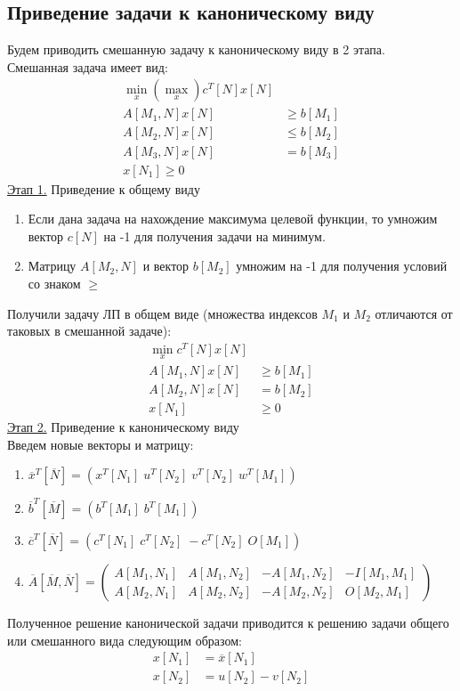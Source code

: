 \subsection{Приведение задачи к каноническому виду}
Будем приводить смешанную задачу к каноническому виду в 2 этапа. \\
Смешанная задача имеет вид:\\
\begin{align*} 
\min_x(\max_x) c^T[N]x[N] \\
A[M_1,N]x[N]&\geq b[M_1] \\
A[M_2,N]x[N]&\leq b[M_2] \\
A[M_3,N]x[N]&=b[M_3] \\
x[N_1]\geq 0
\end{align*}
\underline{Этап 1.} Приведение к общему виду
\begin{enumerate}
	\item Если дана задача на нахождение максимума целевой функции, то умножим вектор $c[N]$ на -1 для получения задачи на минимум.
	\item Матрицу $A[M_2,N]$ и вектор $b[M_2]$ умножим на -1 для получения условий со знаком $\geq$
\end{enumerate}
Получили задачу ЛП в общем виде (множества индексов $M_1$ и $M_2$ отличаются от таковых в смешанной задаче):
\begin{align*} 
\min_x c^T[N]x[N] \\
A[M_1,N]x[N]&\geq b[M_1] \\
A[M_2,N]x[N]&=b[M_2] \\
x[N_1]&\geq 0
\end{align*}
\underline{Этап 2.} Приведение к каноническому виду\\
Введем новые векторы и матрицу:
\begin{enumerate}
	\item $\overline{x}^T[\overline{N}]=(x^T[N_1] \; u^T[N_2] \; v^T[N_2] \; w^T[M_1])$
	\item $\overline{b}^T[\overline{M}]=(b^T[M_1] \; b^T[M_1])$
	\item $\overline{c}^T[\overline{N}]=(c^T[N_1] \; c^T[N_2] \; -c^T[N_2] \; O[M_1])$
	\item $\overline{A}[\overline{M},\overline{N}]=
		\begin{pmatrix} 
			A[M_1,N_1] & A[M_1,N_2] & -A[M_1,N_2] & -I[M_1,M_1] \\ 
			A[M_2,N_1] & A[M_2,N_2] & -A[M_2,N_2] & O[M_2,M_1]
		\end{pmatrix}$
\end{enumerate}
Полученное решение канонической задачи приводится к решению задачи общего или смешанного вида следующим образом:
\begin{align*} 
x[N_1]&=\overline{x}[N_1] \\
x[N_2]&=u[N_2] - v[N_2]
\end{align*}

